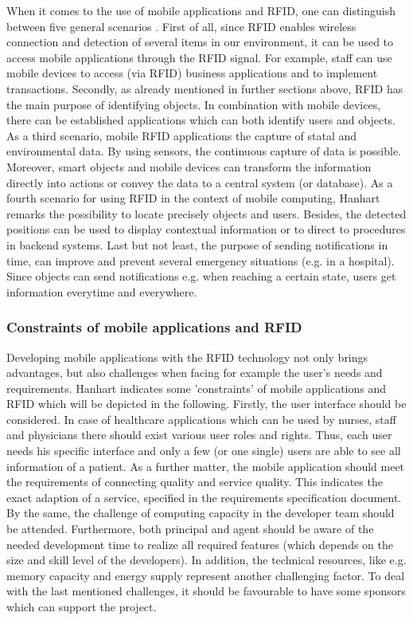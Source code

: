 When it comes to the use of mobile applications and RFID, one can distinguish between five general scenarios \cite[p.13 ff.]{mobile}. First of all, since RFID enables wireless connection and detection of several items in our environment, it can be used to access mobile applications through the RFID signal. For example, staff can use mobile devices to access (via RFID) business applications and to implement transactions. Secondly, as already mentioned in further sections above, RFID has the main purpose of identifying objects. In combination with mobile devices, there can be established applications which can both identify users and objects. As a third scenario, mobile RFID applications the capture of statal and environmental data. By using sensors, the continuous capture of data is possible. Moreover, smart objects and mobile devices can transform the information directly into actions or convey the data to a central system (or database). As a fourth scenario for using RFID in the context of mobile computing, Hanhart \cite[p.13 ff.]{mobile} remarks the possibility to locate precisely objects and users. Besides, the detected positions can be used to display contextual information or to direct to procedures in backend systems. Last but not least, the purpose of sending notifications in time, can improve and prevent several emergency situations (e.g. in a hospital). Since objects can send notifications e.g. when reaching a certain state, users get information everytime and everywhere.  

\subsubsection{Constraints of mobile applications and RFID}

Developing mobile applications with the RFID technology not only brings advantages, but also challenges when facing for example the user's needs and requirements. Hanhart indicates some 'constraints' of mobile applications and RFID \cite[p.16 ff.]{mobile} which will be depicted in the following. Firstly, the user interface should be considered. In case of healthcare applications which can be used by nurses, staff and physicians there should exist various user roles and rights. Thus, each user needs his specific interface and only a few (or one single) users are able to see all information of a patient. As a further matter, the mobile application should meet the requirements of connecting quality and service quality. This indicates the exact adaption of a service, specified in the requirements specification document. By the same, the challenge of computing capacity in the developer team should be attended. Furthermore, both principal and agent should be aware of the needed development time to realize all required features (which depends on the size and skill level of the developers). In addition, the technical resources, like e.g. memory capacity and energy supply represent another challenging factor. To deal with the last mentioned challenges, it should be favourable to have some sponsors which can support the project.

